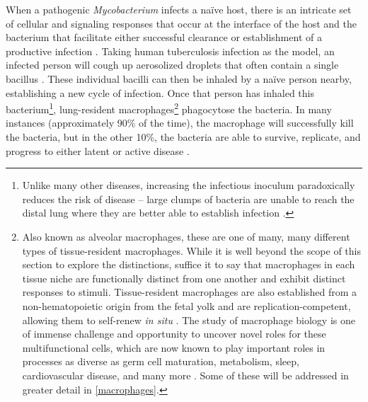 When a pathogenic \textit{Mycobacterium} infects a na\"{i}ve host, there is an intricate set of cellular and signaling responses that occur at the interface of the host and the bacterium that facilitate either successful clearance or establishment of a productive infection \citep{Davies2001b, Bohrer2021, Gagneux2006a, Turner2017}. Taking human tuberculosis infection as the model, an infected person will cough up aerosolized droplets that often contain a single bacillus \citep{Churchyard2017, Mathema2017}. These individual bacilli can then be inhaled by a na\"{i}ve person nearby, establishing a new cycle of infection. Once that person has inhaled this bacterium\footnote{Unlike many other diseases, increasing the infectious inoculum paradoxically reduces the risk of disease -- large clumps of bacteria are unable to reach the distal lung where they are better able to establish infection \citep{Cambier2014b}.}, lung\hyp{}resident macrophages\footnote{Also known as alveolar macrophages, these are one of many, many different types of tissue\hyp{}resident macrophages. While it is well beyond the scope of this section to explore the distinctions, suffice it to say that macrophages in each tissue niche are functionally distinct from one another and exhibit distinct responses to stimuli. Tissue\hyp{}resident macrophages are also established from a non\hyp{}hematopoietic origin from the fetal yolk and are replication\hyp{}competent, allowing them to self\hyp{}renew \textit{in situ} \citep{Davies2013a, Davies2013b, Epelman2014, Ginhoux2014, Ginhoux2016}. The study of macrophage biology is one of immense challenge and opportunity to uncover novel roles for these multifunctional cells, which are now known to play important roles in processes as diverse as germ cell maturation, metabolism, sleep, cardiovascular disease, and many more \citep{Davies2013a, Hussell2014}. Some of these will be addressed in greater detail in \autoref{macrophages}.} phagocytose the bacteria. In many instances (approximately 90\% of the time), the macrophage will successfully kill the bacteria, but in the other 10\%, the bacteria are able to survive, replicate, and progress to either latent or active disease \citep{Kroidl2022, Verrall2014, North2004}.

